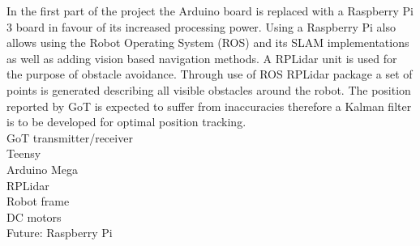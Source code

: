 \noindent In the first part of the project the Arduino board is replaced with a Raspberry Pi 3 board in favour of its increased processing power. Using a Raspberry Pi also allows using the Robot Operating System (ROS) and its SLAM implementations as well as adding vision based navigation methods. A RPLidar unit is used for the purpose of obstacle avoidance. Through use of ROS RPLidar package a set of points is generated describing all visible obstacles around the robot. The position reported by GoT is expected to suffer from inaccuracies therefore a Kalman filter is to be developed for optimal position tracking.\\

GoT transmitter/receiver\\
Teensy\\
Arduino Mega\\
RPLidar\\
Robot frame\\
DC motors\\
Future: Raspberry Pi\\